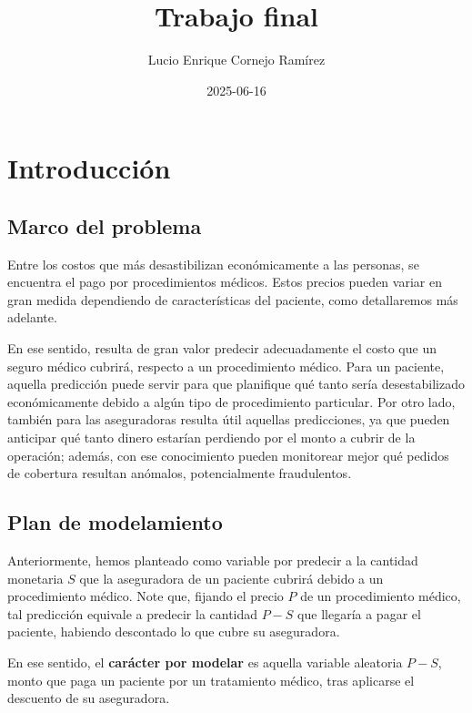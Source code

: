 \documentclass[
  letterpaper,
  DIV=11,
  numbers=noendperiod]{scrartcl}
\title{Trabajo final}
\author{Lucio Enrique Cornejo Ramírez}
\date{2025-06-16}
\renewcommand*\contentsname{Table of contents}
\newcommand\contentsname{Table of contents}
\begin{document}
\maketitle

\renewcommand*\contentsname{Table of contents}
{
\hypersetup{linkcolor=}
\setcounter{tocdepth}{3}
\tableofcontents
}

\section{Introducción}\label{introducciuxf3n}

\subsection{Marco del problema}\label{marco-del-problema}

Entre los costos que más desastibilizan económicamente a las personas,
se encuentra el pago por procedimientos médicos. Estos precios pueden
variar en gran medida dependiendo de características del paciente, como
detallaremos más adelante.

En ese sentido, resulta de gran valor predecir adecuadamente el costo
que un seguro médico cubrirá, respecto a un procedimiento médico. Para
un paciente, aquella predicción puede servir para que planifique qué
tanto sería desestabilizado económicamente debido a algún tipo de
procedimiento particular. Por otro lado, también para las aseguradoras
resulta útil aquellas predicciones, ya que pueden anticipar qué tanto
dinero estarían perdiendo por el monto a cubrir de la operación; además,
con ese conocimiento pueden monitorear mejor qué pedidos de cobertura
resultan anómalos, potencialmente fraudulentos.

\subsection{Plan de modelamiento}\label{plan-de-modelamiento}

Anteriormente, hemos planteado como variable por predecir a la cantidad
monetaria \(S\) que la aseguradora de un paciente cubrirá debido a un
procedimiento médico. Note que, fijando el precio \(P\) de un
procedimiento médico, tal predicción equivale a predecir la cantidad
\(P - S\) que llegaría a pagar el paciente, habiendo descontado lo que
cubre su aseguradora.

En ese sentido, el \textbf{carácter por modelar} es aquella variable
aleatoria \(P - S\), monto que paga un paciente por un tratamiento
médico, tras aplicarse el descuento de su aseguradora.
\end{document}
